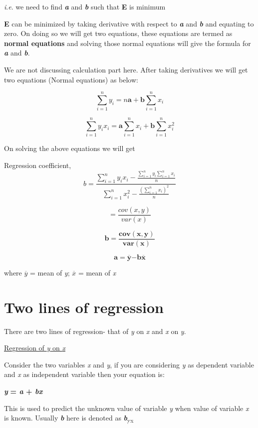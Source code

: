 \documentclass[
]{book}
\begin{document}
\emph{i}.\emph{e}. we need to find \textbf{\emph{a}} and \textbf{\emph{b}} such that \textbf{E} is minimum

\textbf{E} can be minimized by taking derivative with respect to \textbf{\emph{a}} and
\textbf{\emph{b}} and equating to zero. On doing so we will get two equations,
these equations are termed as \textbf{normal equations} and solving those
normal equations will give the formula for \textbf{\emph{a}} and \textbf{\emph{b}}.

We are not discussing calculation part here. After taking derivatives we
will get two equations (Normal equations) as below:

\[\sum_{i = 1}^{n}{y_{i} = n\mathbf{a} + \mathbf{b}\sum_{i = 1}^{n}x_{i}}\]

\[\sum_{i = 1}^{n}{y_{i}x_{i} = \mathbf{a}\sum_{i = 1}^{n}x_{i} + \mathbf{b}\sum_{i = 1}^{n}x_{i}^{2}}\]

On solving the above equations we will get

Regression coefficient,
\[b=\frac{\sum_{i = 1}^{n}{y_{i}x_{i} - \frac{\sum_{i = 1}^{n}{y_{i}\sum_{i = 1}^{n}x_{i}}}{n}}}{\sum_{i = 1}^{n}x_{i}^{2} - \frac{\left( \sum_{i = 1}^{n}x_{i} \right)^{2}}{n}}\]

\[=\frac{cov(x,y)}{var(x)}\]

\[\mathbf{b =}\frac{\mathbf{cov(x,y)}}{\mathbf{var(x)}}
\]

\[\mathbf{a = }\overline{\mathbf{y}}\mathbf{- b}\overline{\mathbf{x}}\]

where \(\overline{y}\) = mean of \emph{y}; \(\overline{x}\) = mean of \emph{x}

\hypertarget{two-lines-of-regression}{%
\section{Two lines of regression}\label{two-lines-of-regression}}

There are two lines of regression- that of \emph{y} on \emph{x} and \emph{x} on \emph{y}.

\ul{Regression of \emph{y} on \emph{x}}

Consider the two variables \emph{x} and \emph{y}, if you are considering \emph{y} as
dependent variable and \emph{x} as independent variable then your equation
is:

\textbf{\emph{y}} \textbf{= \emph{a} + \emph{bx}}

This is used to predict the unknown value of variable \emph{y} when value of
variable \emph{x} is known. Usually \textbf{\emph{b}} here is denoted as \textbf{\emph{b}}\textsubscript{yx}
\end{document}
